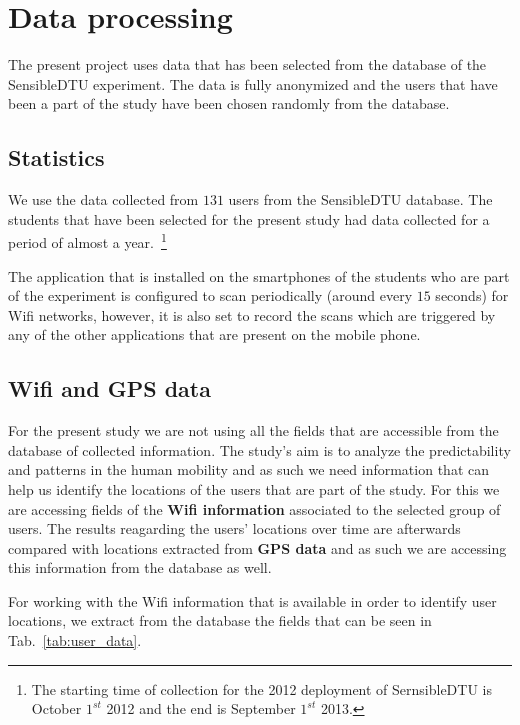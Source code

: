 \chapter{Data processing}
The present project uses data that has been selected from the database of the
SensibleDTU experiment. The data is fully anonymized and the users that have
been a part of the study have been chosen randomly from the database.

\section{Statistics}
We use the data collected from $131$ users from the SensibleDTU database. The
students that have been selected for the present study had data collected for a
period of almost a year.~\footnote{The starting time of collection for the 2012
deployment of SernsibleDTU is October $1^{st}$ 2012 and the end is September
$1^{st}$ 2013.}

The application that is installed on the smartphones of the students who are
part of the experiment is configured to scan periodically (around every $15$
seconds) for Wifi networks, however, it is also set to record the scans which
are triggered by any of the other applications that are present on the mobile
phone.

\section{Wifi and GPS data}
For the present study we are not using all the fields that are accessible from
the database of collected information. The study's aim is to analyze the
predictability and patterns in the human mobility and as such we need
information that can help us identify the locations of the users that are part
of the study. For this we are accessing fields of the \textbf{Wifi information}
associated to the selected group of users. The results reagarding the users'
locations over time are afterwards compared with locations extracted from
\textbf{GPS data} and as such we are accessing this information from the
database as well.

For working with the Wifi information that is available in order to identify
user locations, we extract from the database the fields that can be seen in
Tab.~\ref{tab:user_data}.

